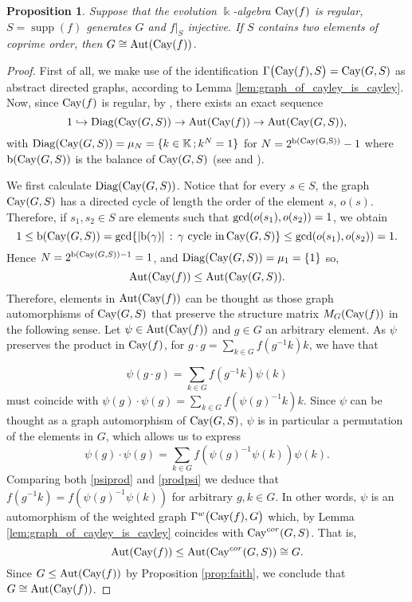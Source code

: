 \documentclass[a4paper,12pt]{amsart}
\newtheorem{proposition}[theorem]{Proposition}
\theoremstyle{definition}
\theoremstyle{remark}
\newcommand{\Aut}{\operatorname{Aut}}
\newcommand{\Cay}{{\rm Cay}}
\newcommand{\supp}{\operatorname{supp}}
\newcommand{\Diag}{\operatorname{Diag}}
\newcommand{\E}{{\mathcal E}}
\newcommand{\graphs}{{{\mathcal G}raphs}}
\begin{document}
\begin{proposition}\label{th:coprime}
Suppose that  the evolution $\Bbbk$-algebra $\Cay(f)$ is regular, $S=\supp(f)$ generates $G$ and $f|_S$ injective. If $S$ contains two elements of coprime order, then $G \cong \Aut (\Cay(f))$.
\end{proposition}
\begin{proof}
First of all,  we make use of the identification $\Gamma\big(\Cay(f),S\big)=\Cay(G,S)$  as abstract directed graphs, according to Lemma \ref{lem:graph_of_cayley_is_cayley}. Now, since $\Cay(f)$ is regular,  by \cite[Theorem 3.2]{Elduque-Labra-2019}, there exists an exact sequence
	$$1\hookrightarrow \Diag(\Cay(G,S))\rightarrow \Aut (\Cay(f))\rightarrow \Aut (\Cay(G,S)),$$
with  $\Diag(\Cay(G,S)) = \mu_N = \{ k \in \mathbb K \, ; k^N =1\}$ for  $N = 2^{\rm b(\Cay(G, S))}-1 $ 	where  $\operatorname b(\Cay(G, S))$ is the balance of $ \Cay(G,S)$ (see  \cite[Section 2]{Elduque-Labra-2019} and \cite[Theorem 2.7]{Elduque-Labra-2019}).

We first calculate $\Diag(\Cay(G,S))$. Notice that for every $s\in S$,  the graph $\Cay(G,S)$ has a directed cycle of length  the order of the element $s$, $o(s)$. Therefore, if  $s_1,s_2\in S$ are elements such that ${\rm gcd} (o(s_1),o(s_2))=1$, we obtain $$1\leq {\rm b}(\Cay(G,S))= {\rm gcd}\{|{\rm b} (\gamma)|\,:\, \gamma\text{ cycle in} \,\Cay(G,S) \}\leq {\rm gcd} (o(s_1),o(s_2))=1.$$
Hence $N=2^{{\rm b}(\Cay(G,S))-1}=1$, and  $\Diag(\Cay(G,S))=\mu_1=\{1\}$ so, $$\Aut(\Cay(f))\leq \Aut(\Cay(G,S)).$$
Therefore, elements in $\Aut(\Cay(f))$ can be thought as those graph automorphisms of $\Cay(G,S)$ that preserve the structure matrix $M_G(\Cay(f))$ in the following sense. Let $\psi \in \Aut(\Cay(f))$ and $g \in G$ an arbitrary element.
As  $\psi$ preserves the product in $\Cay(f)$,  for  $g\cdot g=\sum_{k\in G}f(g^{-1}k)k$, we have that

\begin{equation}\label{psiprod}\psi (g\cdot g) =\sum_{k\in G}f(g^{-1}k) \psi (k)
\end{equation}
 must coincide with $\psi (g) \cdot \psi (g) = \sum_{k\in G}f( \psi(g)^{-1}k)k$.  Since $\psi $ can be thought as a graph automorphism of $\Cay(G,S)$,   $\psi$ is in particular a permutation of the elements in $G$, which allows us to express
 \begin{equation}\label{prodpsi}
 \psi (g) \cdot \psi (g) = \sum_{k \in G}f( \psi(g)^{-1}\psi(k)) \psi(k).
 \end{equation}
 Comparing both \eqref{psiprod} and \eqref{prodpsi} we deduce that $  f(g^{-1}k)= f( \psi(g)^{-1}\psi(k)) $  for arbitrary $g, k \in G$. In other words, $\psi$ is an automorphism of the weighted graph $\Gamma^w\big(\Cay(f),G\big)$ which, by
 Lemma \ref{lem:graph_of_cayley_is_cayley} coincides with $\Cay^{cor}(G,S)$. That is,  $$\Aut(\Cay(f))\leq \Aut(\Cay^{cor}(G,S))\cong G.$$
	Since $G\leq \Aut(\Cay(f))$ by Proposition \ref{prop:faith}, we conclude that $G \cong \Aut (\Cay(f)) $.
\end{proof}
\end{document}
